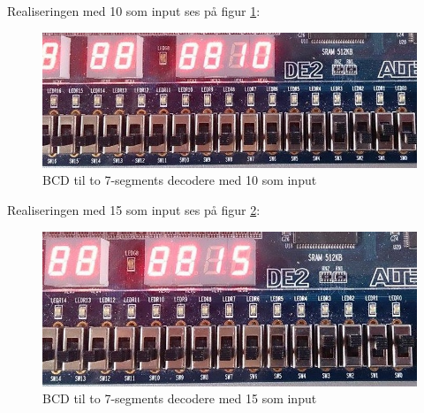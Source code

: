 \begin{enumerate}
Realiseringen med 10 som input ses på figur \ref{fig:2Seg10}:
	\begin{figure}[h]
		\centering
		\includegraphics[scale=0.6]{pictures/Oevelse4/BCD_decoder/BCD_2seg_10.jpg}
		\caption{BCD til to 7-segments decodere med 10 som input}
		\label{fig:2Seg10}
	\end{figure}
	
Realiseringen med 15 som input ses på figur \ref{fig:2Seg15}:
	\begin{figure}[h]
		\centering
		\includegraphics[scale=0.6]{pictures/Oevelse4/BCD_decoder/BCD_2seg_15.jpg}
		\caption{BCD til to 7-segments decodere med 15 som input}
		\label{fig:2Seg15}
	\end{figure}


\end{enumerate}